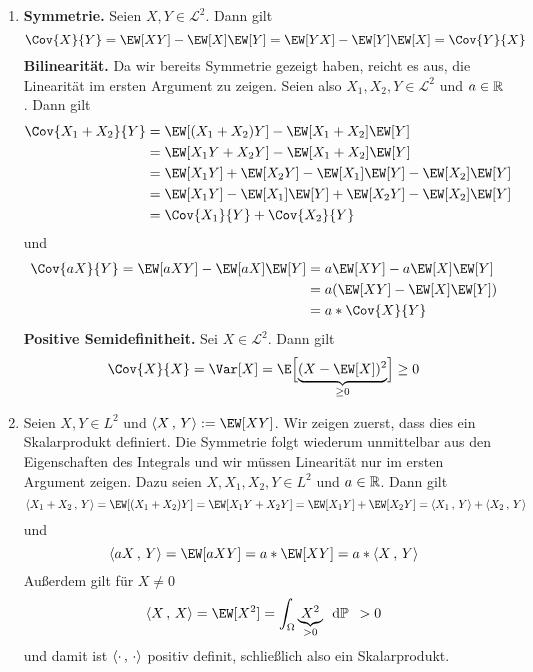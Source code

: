 \begin{exercisePage}
	\begin{enumerate}[leftmargin=*, label=(zu \alph*)]
		\item \textbf{Symmetrie.} Seien $X,Y \in \mathcal{L}^2$. Dann gilt
		\begin{equation*}
			\Cov{X}{Y} = \EW[XY] - \EW[X] \EW[Y] = \EW[YX] - \EW[Y] \EW[X] = \Cov{Y}{X}
		\end{equation*}
		\textbf{Bilinearität.} Da wir bereits Symmetrie gezeigt haben, reicht es aus, die Linearität im ersten Argument zu zeigen. Seien also $X_1, X_2, Y \in \mathcal{L}^2$ und $a \in \mathbb{R}$. Dann gilt
		\begin{equation*}
			\begin{aligned}
			\Cov{X_1 + X_2}{Y} 
			&= \EW[(X_1 + X_2) Y] - \EW[X_1 + X_2] \EW[Y] \\
			&= \EW[X_1 Y + X_2 Y] - \EW[X_1 + X_2] \EW[Y] \\
			&= \EW[X_1 Y] + \EW[X_2 Y] - \EW[X_1] \EW[Y] - \EW[X_2] \EW[Y] \\
			&= \EW[X_1 Y] - \EW[X_1] \EW[Y] + \EW[X_2 Y] - \EW[X_2] \EW[Y] \\
			&= \Cov{X_1}{Y} + \Cov{X_2}{Y}
			\end{aligned}
		\end{equation*}
		und
		\begin{equation*}
			\begin{aligned}
			\Cov{aX}{Y} 
			= \EW[aXY] - \EW[aX] \EW[Y] 
			&= a \EW[XY] - a \EW[X] \EW[Y] \\
			&= a (\EW[XY] - \EW[X]\EW[Y]) \\
			&= a * \Cov{X}{Y}
			\end{aligned}
		\end{equation*}
		\textbf{Positive Semidefinitheit.} Sei $X \in \mathcal{L}^2$. Dann gilt
		\begin{equation*}
			\Cov{X}{X} = \Var[X] = \E \Bigl[ \underbrace{(X - \EW[X])^2}_{\ge 0} \Bigr] \ge 0
		\end{equation*}
		\pagebreak
		\item Seien $X,Y \in L^2$ und $\scal{X}{Y} \defeq \EW[XY]$. Wir zeigen zuerst, dass dies ein Skalarprodukt definiert.
		Die Symmetrie folgt wiederum unmittelbar aus den Eigenschaften des Integrals und wir müssen Linearität nur im ersten Argument zeigen. Dazu seien $X, X_1, X_2, Y \in L^2$ und $a \in \mathbb{R}$. Dann gilt
		\begin{equation*}
			\scal{X_1 + X_2}{Y} = \EW[(X_1 + X_2) Y] = \EW[X_1 Y + X_2 Y] = \EW[X_1 Y] + \EW[X_2 Y] = \scal{X_1}{Y} + \scal{X_2}{Y}
		\end{equation*}
		und
		\begin{equation*}
			\scal{a X}{Y} = \EW[a X Y] = a * \EW[XY] = a * \scal{X}{Y}
		\end{equation*}
		Außerdem gilt für $X \neq 0$
		\begin{equation*}
			\scal{X}{X} = \EW[X^2] = \int_{\Omega} \underbrace{X^2}_{>0} \diff{\P} \enskip > 0
		\end{equation*}
		und damit ist $\langle \cdot\, ,\, \cdot \rangle$ positiv definit, schließlich also ein Skalarprodukt.
		

\end{enumerate}
\end{exercisePage}

